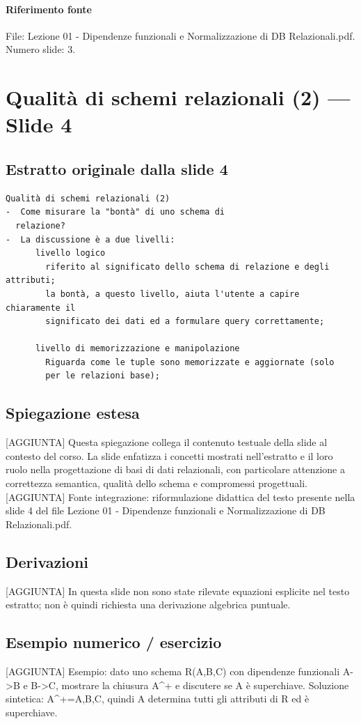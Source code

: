 \documentclass[11pt]{article}
\begin{document}
\paragraph{Riferimento fonte} File: Lezione 01 - Dipendenze funzionali e Normalizzazione di DB Relazionali.pdf. Numero slide: 3.
\section{Qualità di schemi relazionali (2) --- Slide 4}
\subsection*{Estratto originale dalla slide 4}
\begin{lstlisting}
Qualità di schemi relazionali (2)
-  Come misurare la "bontà" di uno schema di
  relazione?
-  La discussione è a due livelli:
      livello logico
        riferito al significato dello schema di relazione e degli attributi;
        la bontà, a questo livello, aiuta l'utente a capire chiaramente il
        significato dei dati ed a formulare query correttamente;

      livello di memorizzazione e manipolazione
        Riguarda come le tuple sono memorizzate e aggiornate (solo
        per le relazioni base);
\end{lstlisting}
\subsection*{Spiegazione estesa}
[AGGIUNTA] Questa spiegazione collega il contenuto testuale della slide al contesto del corso. La slide enfatizza i concetti mostrati nell'estratto e il loro ruolo nella progettazione di basi di dati relazionali, con particolare attenzione a correttezza semantica, qualità dello schema e compromessi progettuali.
[AGGIUNTA] Fonte integrazione: riformulazione didattica del testo presente nella slide 4 del file Lezione 01 - Dipendenze funzionali e Normalizzazione di DB Relazionali.pdf.
\subsection*{Derivazioni}
[AGGIUNTA] In questa slide non sono state rilevate equazioni esplicite nel testo estratto; non è quindi richiesta una derivazione algebrica puntuale.
\subsection*{Esempio numerico / esercizio}
[AGGIUNTA] Esempio: dato uno schema R(A,B,C) con dipendenze funzionali A->B e B->C, mostrare la chiusura A^+ e discutere se A è superchiave. Soluzione sintetica: A^+={A,B,C}, quindi A determina tutti gli attributi di R ed è superchiave.
\end{document}
